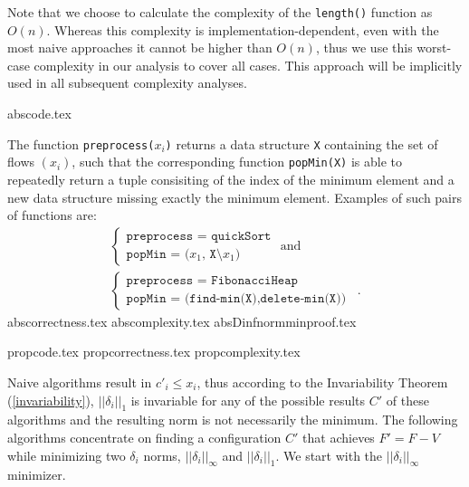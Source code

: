   Note that we choose to calculate the complexity of the \texttt{length()} function as $O\left(n\right)$. Whereas this
  complexity is implementation-dependent, even with the most naive approaches it cannot be higher than $O\left(n\right)$,
  thus we use this worst-case complexity in our analysis to cover all cases. This approach will be implicitly used in all
  subsequent complexity analyses.

  {abscode.tex}

  The function \texttt{preprocess(}$x_i$\texttt{)} returns a data structure \texttt{X} containing the set of flows
  $\left(x_i\right)$, such that the corresponding function \texttt{popMin(X)} is able to repeatedly return a tuple
  consisiting of the index of the minimum element and a new data structure missing exactly the minimum element.
  Examples of such pairs of functions are:
  \begin{equation*}
  \begin{gathered}
    \begin{cases}
      \texttt{preprocess = quickSort} \\
      \texttt{popMin = (}x_1\texttt{, X}\setminus x_1\texttt{)}
    \end{cases}
    \mbox{ and} \\
    \begin{cases}
      \texttt{preprocess = FibonacciHeap} \\
      \texttt{popMin = (find-min(X),delete-min(X))}
    \end{cases} \enspace.
  \end{gathered}
  \end{equation*}
  {abscorrectness.tex}
  {abscomplexity.tex}
  {absDinfnormminproof.tex}

  {propcode.tex}
  {propcorrectness.tex}
  {propcomplexity.tex}

  Naive algorithms result in $c'_i \leq x_i$, thus according to the Invariability Theorem (\ref{invariability}),
  $||\delta_i||_1$ is invariable for any of the possible results $C'$ of these algorithms and the resulting norm is not
  necessarily the minimum. The following algorithms concentrate on finding a configuration $C'$ that achieves $F' = F - V$
  while minimizing two $\delta_i$ norms, $||\delta_i||_\infty$ and $||\delta_i||_1$. We start with the
  $||\delta_i||_\infty$ minimizer.

